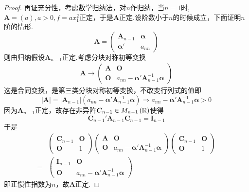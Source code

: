 {\begin{proof}
        再证充分性，考虑数学归纳法，对$n$作归纳，当$n=1$时,$\bm{A}=\left(a\right),a>0,f=ax_1^2$正定，于是$\bm{A}$正定.设阶数小于$n$的时候成立，下面证明$n$阶的情形.\[
            \bm{A}=\begin{pmatrix}
                \bm{A}_{n-1} & \bm{\alpha} \\
                \bm{\alpha}' & a_{nn}
            \end{pmatrix}
        \]则由归纳假设$\bm{A}_{n-1}$正定.考虑分块对称初等变换\begin{align*}
            \bm{A}\longrightarrow\begin{pmatrix}
                                     \bm{A} & \bm{O}                                          \\
                                     \bm{O} & a_{nn}-\bm{\alpha}'\bm{A}_{n-1}^{-1}\bm{\alpha}
                                 \end{pmatrix}
        \end{align*}这是合同变换，是第三类分块对称初等变换，不改变行列式的值即\[
            \left|\bm{A}\right|=\left|\bm{A}_{n-1}\right|\left(
            a_{nn}-\bm{\alpha}'\bm{A}_{n-1}^{-1}\bm{\alpha}
            \right)\Longrightarrow a_{nn}-\bm{\alpha}'\bm{A}_{n-1}^{-1}\bm{\alpha}>0
        \]因为$\bm{A}_{n-1}$正定，故存在非异阵$\bm{C}_{n-1}\in M_{n-1}\left(\mathbb{R} \right)$使得\[
            \bm{C}_{n-1}'\bm{A}_{n-1}\bm{C}_{n-1}=\bm{I}_{n-1}
        \]于是\begin{align*}
              & \begin{pmatrix}
                    \bm{C}_{n-1} & \bm{O} \\
                    \bm{O}       & 1
                \end{pmatrix}
            \begin{pmatrix}
                \bm{A} & \bm{O}                                          \\
                \bm{O} & a_{nn}-\bm{\alpha}'\bm{A}_{n-1}^{-1}\bm{\alpha}
            \end{pmatrix}
            \begin{pmatrix}
                \bm{C}_{n-1} & \bm{O} \\
                \bm{O}       & 1
            \end{pmatrix}                                              \\
            = & \begin{pmatrix}
                    \bm{I}_{n-1} & \bm{O}                                          \\
                    \bm{O}       & a_{nn}-\bm{\alpha}'\bm{A}_{n-1}^{-1}\bm{\alpha}
                \end{pmatrix}
        \end{align*}即正惯性指数为$n$，故$\bm{A}$正定.
    \end{proof}
}
